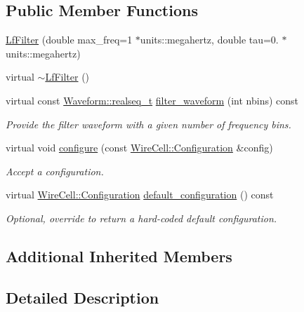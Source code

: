 \subsection*{Public Member Functions}
\begin{DoxyCompactItemize}
\item 
\hyperlink{class_wire_cell_1_1_sig_proc_1_1_lf_filter_a2fe080ae7cf7e8b4173985d22c29e558}{Lf\+Filter} (double max\+\_\+freq=1 $\ast$units\+::megahertz, double tau=0. $\ast$units\+::megahertz)
\item 
virtual \hyperlink{class_wire_cell_1_1_sig_proc_1_1_lf_filter_a91201a3352c8d10c32b765ef402bc577}{$\sim$\+Lf\+Filter} ()
\item 
virtual const \hyperlink{namespace_wire_cell_1_1_waveform_a479175e541c8545e87cd8063b74b6956}{Waveform\+::realseq\+\_\+t} \hyperlink{class_wire_cell_1_1_sig_proc_1_1_lf_filter_a4b53fff2e1a37331fa8d8a62438c581f}{filter\+\_\+waveform} (int nbins) const
\begin{DoxyCompactList}\small\item\em Provide the filter waveform with a given number of frequency bins. \end{DoxyCompactList}\item 
virtual void \hyperlink{class_wire_cell_1_1_sig_proc_1_1_lf_filter_afb4e1b2ea202e9df9fc3aa1399171506}{configure} (const \hyperlink{namespace_wire_cell_a9f705541fc1d46c608b3d32c182333ee}{Wire\+Cell\+::\+Configuration} \&config)
\begin{DoxyCompactList}\small\item\em Accept a configuration. \end{DoxyCompactList}\item 
virtual \hyperlink{namespace_wire_cell_a9f705541fc1d46c608b3d32c182333ee}{Wire\+Cell\+::\+Configuration} \hyperlink{class_wire_cell_1_1_sig_proc_1_1_lf_filter_a1a6475fbf1b682840d50b653f86915ca}{default\+\_\+configuration} () const
\begin{DoxyCompactList}\small\item\em Optional, override to return a hard-\/coded default configuration. \end{DoxyCompactList}\end{DoxyCompactItemize}
\subsection*{Additional Inherited Members}


\subsection{Detailed Description}


